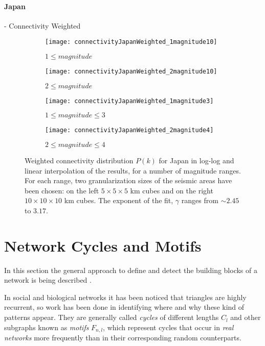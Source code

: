 \paragraph{Japan} - Connectivity Weighted
\begin{figure}[!h]
\begin{subfigure}{.99\textwidth}
  \centering
  \texttt{[image: connectivityJapanWeighted\_1magnitude10]}
  \caption{$1 \leq magnitude$}
  \label{fig:conWeiJa1mag10}
\end{subfigure}%

\begin{subfigure}{.99\textwidth}
  \centering
  \texttt{[image: connectivityJapanWeighted\_2magnitude10]}
  \caption{$2\leq magnitude$}
  \label{fig:conWeiJa2mag10}
\end{subfigure}%

\begin{subfigure}{.99\textwidth}
  \centering
  \texttt{[image: connectivityJapanWeighted\_1magnitude3]}
  \caption{$1\leq magnitude \leq 3$}
  \label{fig:conWeiJa1mag3}
\end{subfigure}%

\begin{subfigure}{.99\textwidth}
  \centering
  \texttt{[image: connectivityJapanWeighted\_2magnitude4]}
  \caption{$2 \leq magnitude \leq 4$}
  \label{fig:conWeiJa2mag4}
\end{subfigure}%

\caption{Weighted connectivity distribution $P(k)$ for Japan in log-log and linear interpolation of the results, for a number of magnitude ranges. For each range, two granularization sizes of the seismic areas have been chosen: on the left $5 \times 5 \times5 $ km cubes and on the right $10 \times 10 \times 10$ km cubes. The exponent of the fit, $\gamma$ ranges from $\sim 2.45$ to $3.17$.}
\label{fig:connectivityItWeighted}
\end{figure}


\clearpage
\section{Network Cycles and Motifs}
In this section the general approach to define and detect the building blocks of a network is being described \cite{latora}.\par 
In social and biological networks it has been noticed that triangles are highly recurrent, so work has been done in identifying where and why these kind of patterns appear. They are generally called {\it cycles} of different lengths $C_l$ and other subgraphs known as {\it motifs} $F_{n,l}$, which represent cycles that occur in {\it real networks} more frequently than in their corresponding random counterparts.


